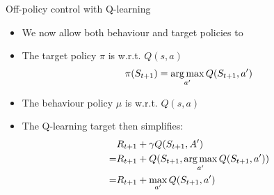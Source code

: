 \bgroup
\begin{frame}{Off-policy control with Q-learning}
\begin{itemize}
\item We now allow both behaviour and target policies to 
\item The target policy $\pi$ is  w.r.t. $Q(s, a)$
\begin{equation*}
\pi(S_{t+1}) = \operatorname*{arg\,max}_{a^{\prime}}Q(S_{t+1}, a^{\prime})
\end{equation*}
\item The behaviour policy $\mu$ is  w.r.t. $Q(s, a)$
\item The Q-learning target then simplifies:
\begin{align*}
& R_{t+1} + \gamma Q(S_{t+1}, A^{\prime})\\
=& R_{t+1} + Q(S_{t+1}, \operatorname*{arg\,max}_{a^{\prime}} Q(S_{t+1}, a^{\prime}))\\
=& R_{t+1} + \max_{a^{\prime}}Q(S_{t+1},a^{\prime})
\end{align*}
\end{itemize}
\end{frame}
\egroup
